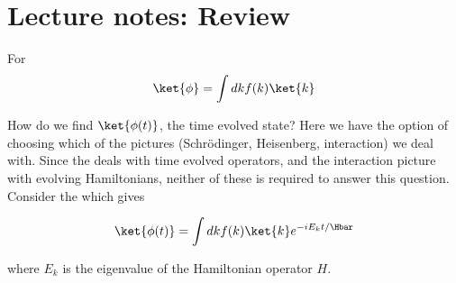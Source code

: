 %
%
\section{Lecture notes: Review}

For
\begin{equation}\label{eqn:lecture5BigReviewCh3Dynamical:20}
\ket{\phi} = \int dk f(k) \ket{k}
\end{equation}

How do we find \(\ket{\phi(t)}\), the time evolved state?  Here we have the option of choosing which of the pictures (Schr\"{o}dinger, Heisenberg, interaction) we deal with.  Since the  deals with time evolved operators, and the interaction picture with evolving Hamiltonians, neither of these is required to answer this question.  Consider the  which gives

\begin{equation}\label{eqn:lecture5BigReviewCh3Dynamical:40}
\ket{\phi(t)} = \int dk f(k) \ket{k} e^{-i E_k t/\Hbar}
\end{equation}

where \(E_k\) is the eigenvalue of the Hamiltonian operator \(H\).


